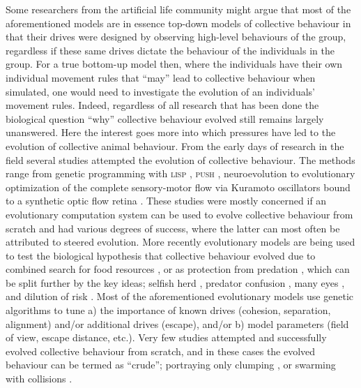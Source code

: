 Some researchers from the artificial life community might argue that most of the aforementioned models are in essence top-down models of collective behaviour in that their drives were designed by observing high-level behaviours of the group, regardless if these same drives dictate the behaviour of the individuals in the group. For a true bottom-up model then, where the individuals have their own individual movement rules that ``may'' lead to collective behaviour when simulated, one would need to investigate the evolution of an individuals' movement rules. Indeed, regardless of all research that has been done the biological question ``why'' collective behaviour evolved still remains largely unanswered. Here the interest goes more into which pressures have led to the evolution of collective animal behaviour. From the early days of research in the field several studies attempted the evolution of collective behaviour. The methods range from genetic programming with \textsc{lisp} \cite{reynolds1993evolved}, \textsc{push} \cite{spector2005emergence}, neuroevolution \cite{kwasnicka2011flocking,ward2001evolving,zaera1996not} to evolutionary optimization of the complete sensory-motor flow via Kuramoto oscillators bound to a synthetic optic flow retina \cite{pino2015modeling}. These studies were mostly concerned if an evolutionary computation system can be used to evolve collective behaviour from scratch and had various degrees of success, where the latter can most often be attributed to steered evolution. More recently evolutionary models are being used to test the biological hypothesis that collective behaviour evolved due to combined search for food resources \cite{witkowski2016emergence}, or as protection from predation \cite{oboshi2003collective}, which can be split further by the key ideas; selfish herd \cite{hamilton1971geometry,morrell2015consequences,olson2013critical,olson2016evolution,reluga2005simulated,wood2007evolving}, predator confusion \cite{chen2014minimal,kunz2006prey,nishimura1997emergence,olson2013predator,zheng2005behavior}, many eyes \cite{ruxton2008application,olson2015exploring}, and dilution of risk \cite{tosh2011conditions}. Most of the aforementioned evolutionary models use genetic algorithms to tune a) the importance of known drives (cohesion, separation, alignment) and/or additional drives (\eg escape), and/or b) model parameters (field of view, escape distance, etc.). Very few studies attempted and successfully evolved collective behaviour from scratch, and in these cases the evolved behaviour can be termed as ``crude''; portraying only clumping \cite{biswas2014causes,witkowski2016emergence}, or swarming with collisions \cite{olson2013critical,olson2013predator,olson2016evolution,witkowski2016emergence}. 

